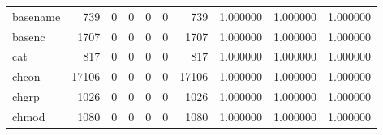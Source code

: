 \begin{tabular}{lrrrrrrrrr}
basename  &                                                739 &                                                  0 &                                                  0 &                                                  0 &                                                  0 &                                                739 &                                           1.000000 &                               1.000000 &                             1.000000 \\
basenc    &                                               1707 &                                                  0 &                                                  0 &                                                  0 &                                                  0 &                                               1707 &                                           1.000000 &                               1.000000 &                             1.000000 \\
cat       &                                                817 &                                                  0 &                                                  0 &                                                  0 &                                                  0 &                                                817 &                                           1.000000 &                               1.000000 &                             1.000000 \\
chcon     &                                              17106 &                                                  0 &                                                  0 &                                                  0 &                                                  0 &                                              17106 &                                           1.000000 &                               1.000000 &                             1.000000 \\
chgrp     &                                               1026 &                                                  0 &                                                  0 &                                                  0 &                                                  0 &                                               1026 &                                           1.000000 &                               1.000000 &                             1.000000 \\
chmod     &                                               1080 &                                                  0 &                                                  0 &                                                  0 &                                                  0 &                                               1080 &                                           1.000000 &                               1.000000 &                             1.000000 \\

\end{tabular}
